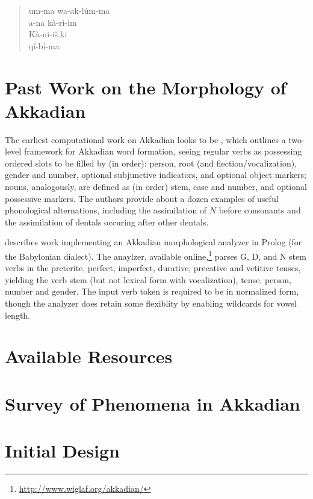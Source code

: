\documentclass[11pt,letterpaper]{article}
\begin{document}
\begin{quote}
um-ma wa-ak-l\'um-ma\\
a-na k\`a-ri-im\\
K\`a-ni-i\v{s}.ki\\
q\'i-b\'i-ma
\end{quote}


\section{Past Work on the Morphology of Akkadian}

The earliest computational work on Akkadian looks to be \cite{Kataja:1988:FDS:991635.991699}, which outlines a two-level framework for Akkadian word formation, seeing regular verbs as possessing ordered slots to be filled by (in order): person, root (and flection/vocalization), gender and number, optional subjunctive indicators, and optional object markers; nouns, analogously, are defined as (in order) stem, case and number, and optional possessive markers.  The authors provide about a dozen examples of useful phonological alternations, including the assimilation of $N$ before consonants and the assimilation of dentals occuring after other dentals.

\cite{Macks:2002:PAV:1118637.1118638} describes work implementing an Akkadian morphological analyzer in Prolog (for the Babylonian dialect).  The anaylzer, available online,\footnote{\url{http://www.wiglaf.org/akkadian/}} parses G, D, and N stem verbs in the preterite, perfect, imperfect, durative, precative and vetitive tenses, yielding the verb stem (but not lexical form with vocalization), tense, person, number and gender.  The input verb token is required to be in normalized form, though the analyzer does retain some flexiblity by enabling wildcards for vowel length.

\section{Available Resources}

\section{Survey of Phenomena in Akkadian}

\section{Initial Design}
\end{document}
